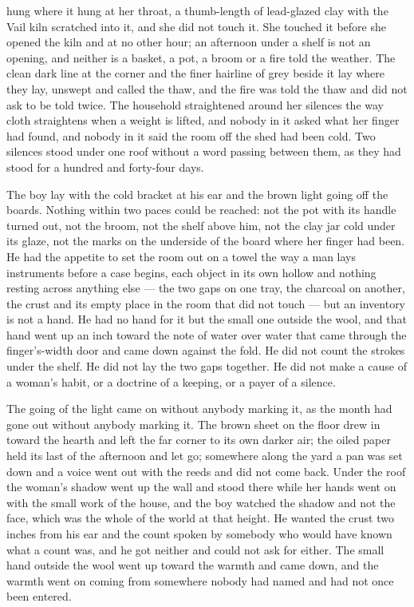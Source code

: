  hung where it hung at her throat, a thumb-length of lead-glazed clay with the Vail kiln scratched into it, and she did not touch it. She touched it before she opened the kiln and at no other hour; an afternoon under a shelf is not an opening, and neither is a basket, a pot, a broom or a fire told the weather. The clean dark line at the corner and the finer hairline of grey beside it lay where they lay, unswept and called the thaw, and the fire was told the thaw and did not ask to be told twice. The household straightened around her silences the way cloth straightens when a weight is lifted, and nobody in it asked what her finger had found, and nobody in it said the room off the shed had been cold. Two silences stood under one roof without a word passing between them, as they had stood for a hundred and forty-four days.

\scenebreak

The boy lay with the cold bracket at his ear and the brown light going off the boards. Nothing within two paces could be reached: not the pot with its handle turned out, not the broom, not the shelf above him, not the clay jar cold under its glaze, not the marks on the underside of the board where her finger had been. He had the appetite to set the room out on a towel the way a man lays instruments before a case begins, each object in its own hollow and nothing resting across anything else --- the two gaps on one tray, the charcoal on another, the crust and its empty place in the room that did not touch --- but an inventory is not a hand. He had no hand for it but the small one outside the wool, and that hand went up an inch toward the note of water over water that came through the finger's-width door and came down against the fold. He did not count the strokes under the shelf. He did not lay the two gaps together. He did not make a cause of a woman's habit, or a doctrine of a keeping, or a payer of a silence.

The going of the light came on without anybody marking it, as the month had gone out without anybody marking it. The brown sheet on the floor drew in toward the hearth and left the far corner to its own darker air; the oiled paper held its last of the afternoon and let go; somewhere along the yard a pan was set down and a voice went out with the reeds and did not come back. Under the roof the woman's shadow went up the wall and stood there while her hands went on with the small work of the house, and the boy watched the shadow and not the face, which was the whole of the world at that height. He wanted the crust two inches from his ear and the count spoken by somebody who would have known what a count was, and he got neither and could not ask for either. The small hand outside the wool went up toward the warmth and came down, and the warmth went on coming from somewhere nobody had named and had not once been entered.

